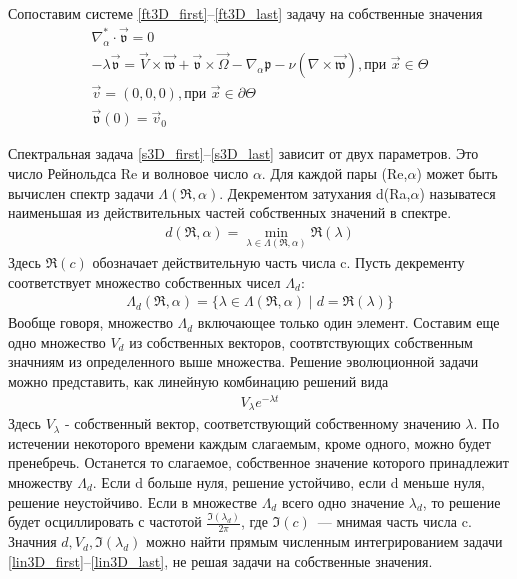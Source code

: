 Сопоставим системе \ref{ft3D_first}--\ref{ft3D_last} задачу на собственные значения
\begin{gather} 
  \label{s3D_first}
  \nabla_\alpha^* \cdot  \mathfrak{\vec v} = 0\\
  - \lambda \mathfrak{\vec v} = \vec V \times \mathfrak{\vec w} + \mathfrak{\vec v} \times \vec \Omega - 
		\nabla_\alpha \mathfrak{p} - \nu ( \nabla \times \mathfrak{\vec w} ), \text{при } \vec x \in \Theta\\
  \vec v = (0,0,0), \text{при } \vec x \in \partial \Theta\\
  \mathfrak{\vec v} (0) = \vec v _0 \label{s3D_last}
\end{gather}


Спектральная задача \ref{s3D_first}--\ref{s3D_last} зависит от двух параметров. Это число Рейнольдса Re и волновое число $\alpha$. Для каждой пары (Re,$\alpha$) может быть вычислен спектр задачи $\Lambda(\Re,\alpha)$. Декрементом затухания d(Ra,$\alpha$) называтеся наименьшая из действительных частей собственных значений в спектре.
\begin{gather}
 d(\Re,\alpha) = \min_{\lambda \in \Lambda(\Re,\alpha)} \mathfrak{R}(\lambda)
\end{gather}
Здесь $\mathfrak{R}(c)$ обозначает действительную часть числа c. Пусть декременту соответствует множество собственных чисел $\Lambda_d$:
\begin{gather}
 \Lambda_d(\Re,\alpha) = \{ \lambda \in \Lambda(\Re,\alpha) \mid d = \mathfrak{R}(\lambda) \}
\end{gather}
Вообще говоря, множество $\Lambda_d$ включающее только один элемент.
Составим еще одно множество $V_d$ из собственных векторов, соотвтствующих собственным значниям из определенного выше множества. Решение эволюционной задачи можно представить, как линейную комбинацию решений вида 
\begin{gather}
 V_\lambda e^{-\lambda t}
\end{gather}
Здесь $V_\lambda$ - собственный вектор, соответствующий собственному значению $\lambda$. 
По истечении некоторого времени каждым слагаемым, кроме одного, можно будет пренебречь. Останется то слагаемое, собственное значение которого принадлежит множеству $\Lambda_d$. Если d больше нуля, решение устойчиво, если d 
меньше нуля, решение неустойчиво. Если в множестве $\Lambda_d$ всего одно значение $\lambda_d$, то 
решение будет осциллировать с частотой $\frac{\mathfrak{I}(\lambda_d)}{2\pi}$, где 
$\mathfrak{I}(c)$~--- мнимая часть числа c. Значния $d, V_d, \mathfrak{I}(\lambda_d)$ можно найти 
прямым численным интегрированием задачи \ref{lin3D_first}--\ref{lin3D_last}, не решая задачи на собственные значения.



